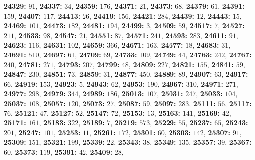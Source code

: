 \textsf{\bfseries 24329:} $91$, \textsf{\bfseries 24337:} $34$, \textsf{\bfseries 24359:} $176$, \textsf{\bfseries 24371:} $21$, \textsf{\bfseries 24373:} $68$, \textsf{\bfseries 24379:} $61$, \textsf{\bfseries 24391:} $159$, \textsf{\bfseries 24407:} $117$, \textsf{\bfseries 24413:} $26$, \textsf{\bfseries 24419:} $156$, \textsf{\bfseries 24421:} $284$, \textsf{\bfseries 24439:} $12$, \textsf{\bfseries 24443:} $15$, \textsf{\bfseries 24469:} $101$, \textsf{\bfseries 24473:} $182$, \textsf{\bfseries 24481:} $194$, \textsf{\bfseries 24499:} $3$, \textsf{\bfseries 24509:} $59$, \textsf{\bfseries 24517:} $7$, \textsf{\bfseries 24527:} $211$, \textsf{\bfseries 24533:} $98$, \textsf{\bfseries 24547:} $21$, \textsf{\bfseries 24551:} $87$, \textsf{\bfseries 24571:} $241$, \textsf{\bfseries 24593:} $283$, \textsf{\bfseries 24611:} $91$, \textsf{\bfseries 24623:} $116$, \textsf{\bfseries 24631:} $102$, \textsf{\bfseries 24659:} $366$, \textsf{\bfseries 24671:} $163$, \textsf{\bfseries 24677:} $18$, \textsf{\bfseries 24683:} $31$, \textsf{\bfseries 24691:} $510$, \textsf{\bfseries 24697:} $61$, \textsf{\bfseries 24709:} $69$, \textsf{\bfseries 24733:} $109$, \textsf{\bfseries 24749:} $44$, \textsf{\bfseries 24763:} $242$, \textsf{\bfseries 24767:} $240$, \textsf{\bfseries 24781:} $271$, \textsf{\bfseries 24793:} $207$, \textsf{\bfseries 24799:} $48$, \textsf{\bfseries 24809:} $227$, \textsf{\bfseries 24821:} $155$, \textsf{\bfseries 24841:} $59$, \textsf{\bfseries 24847:} $230$, \textsf{\bfseries 24851:} $73$, \textsf{\bfseries 24859:} $31$, \textsf{\bfseries 24877:} $450$, \textsf{\bfseries 24889:} $89$, \textsf{\bfseries 24907:} $63$, \textsf{\bfseries 24917:} $66$, \textsf{\bfseries 24919:} $153$, \textsf{\bfseries 24923:} $5$, \textsf{\bfseries 24943:} $62$, \textsf{\bfseries 24953:} $190$, \textsf{\bfseries 24967:} $310$, \textsf{\bfseries 24971:} $271$, \textsf{\bfseries 24977:} $298$, \textsf{\bfseries 24979:} $344$, \textsf{\bfseries 24989:} $186$, \textsf{\bfseries 25013:} $107$, \textsf{\bfseries 25031:} $247$, \textsf{\bfseries 25033:} $104$, \textsf{\bfseries 25037:} $108$, \textsf{\bfseries 25057:} $120$, \textsf{\bfseries 25073:} $27$, \textsf{\bfseries 25087:} $59$, \textsf{\bfseries 25097:} $283$, \textsf{\bfseries 25111:} $56$, \textsf{\bfseries 25117:} $76$, \textsf{\bfseries 25121:} $47$, \textsf{\bfseries 25127:} $52$, \textsf{\bfseries 25147:} $72$, \textsf{\bfseries 25153:} $13$, \textsf{\bfseries 25163:} $141$, \textsf{\bfseries 25169:} $42$, \textsf{\bfseries 25171:} $161$, \textsf{\bfseries 25183:} $322$, \textsf{\bfseries 25189:} $7$, \textsf{\bfseries 25219:} $573$, \textsf{\bfseries 25229:} $55$, \textsf{\bfseries 25237:} $65$, \textsf{\bfseries 25243:} $201$, \textsf{\bfseries 25247:} $101$, \textsf{\bfseries 25253:} $11$, \textsf{\bfseries 25261:} $172$, \textsf{\bfseries 25301:} $60$, \textsf{\bfseries 25303:} $142$, \textsf{\bfseries 25307:} $91$, \textsf{\bfseries 25309:} $151$, \textsf{\bfseries 25321:} $199$, \textsf{\bfseries 25339:} $22$, \textsf{\bfseries 25343:} $38$, \textsf{\bfseries 25349:} $135$, \textsf{\bfseries 25357:} $39$, \textsf{\bfseries 25367:} $60$, \textsf{\bfseries 25373:} $119$, \textsf{\bfseries 25391:} $42$, \textsf{\bfseries 25409:} $28$, 
